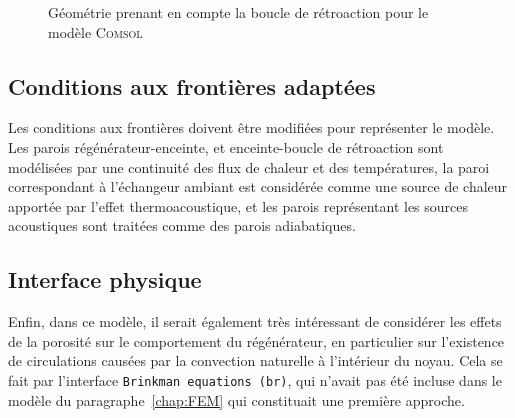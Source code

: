 \begin{figure}[!ht]
	\centering
	
	\caption{Géométrie prenant en compte la boucle de rétroaction pour le modèle \textsc{Comsol}\textss\textregistered}
	\label{fig:Geometrie_FeedbackLoop}
\end{figure}

\subsection{Conditions aux frontières adaptées}
Les conditions aux frontières doivent être modifiées pour représenter le modèle. Les parois régénérateur-enceinte, et enceinte-boucle de rétroaction sont modélisées par une continuité des flux de chaleur et des températures, la paroi correspondant à l'échangeur ambiant est considérée comme une source de chaleur apportée par l'effet thermoacoustique, et les parois représentant les sources acoustiques sont traitées comme des parois adiabatiques.

\subsection{Interface physique}
Enfin, dans ce modèle, il serait également très intéressant de considérer les effets de la porosité sur le comportement du régénérateur, en particulier sur l'existence de circulations causées par la convection naturelle à l'intérieur du noyau. Cela se fait par l'interface \texttt{Brinkman equations (br)}, qui n'avait pas été incluse dans le modèle du paragraphe~\ref{chap:FEM} qui constituait une première approche.





